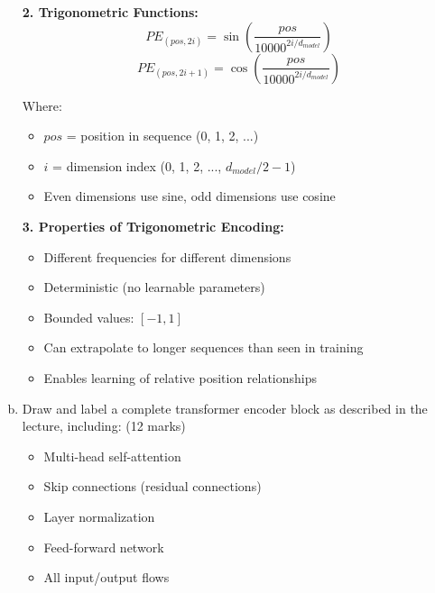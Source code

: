 \documentclass[12pt]{article}
\begin{document}
\begin{enumerate}[(a)]
{    \textbf{2. Trigonometric Functions:}
    $$PE_{(pos, 2i)} = \sin\left(\frac{pos}{10000^{2i/d_{model}}}\right)$$
    $$PE_{(pos, 2i+1)} = \cos\left(\frac{pos}{10000^{2i/d_{model}}}\right)$$
    
    Where:
    \begin{itemize}
        \item $pos$ = position in sequence (0, 1, 2, ...)
        \item $i$ = dimension index (0, 1, 2, ..., $d_{model}/2-1$)
        \item Even dimensions use sine, odd dimensions use cosine
    \end{itemize}
    
    \textbf{3. Properties of Trigonometric Encoding:}
    \begin{itemize}
        \item Different frequencies for different dimensions
        \item Deterministic (no learnable parameters)
        \item Bounded values: $[-1, 1]$
        \item Can extrapolate to longer sequences than seen in training
        \item Enables learning of relative position relationships
    \end{itemize}
    }
    
    \item Draw and label a complete transformer encoder block as described in the lecture, including: \hfill (12 marks)
    \begin{itemize}
        \item Multi-head self-attention
        \item Skip connections (residual connections)
        \item Layer normalization
        \item Feed-forward network
        \item All input/output flows
    \end{itemize}
    
    \begin{center}
\end{center}
\end{enumerate}
\end{document}
